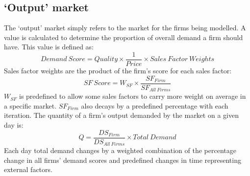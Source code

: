 \documentclass[11pt]{article}
\begin{document}
\subsection{`Output' market}
The `output' market simply refers to the market for the firms being modelled. A value is calculated to determine the proportion of overall demand a firm should have. This value is defined as:
\[
	Demand\ Score = Quality \times \frac{1}{Price} \times Sales\ Factor\ Weights
\]
Sales factor weights are the product of the firm's score for each sales factor:
\[
	SF\ Score = W_{SF} \times \frac{SF_{Firm}}{SF_{All\ Firms}}
\]
$ W_{SF} $ is predefined to allow some sales factors to carry more weight on average in a specific market. $ SF_{Firm} $ also decays by a predefined percentage with each iteration. The quantity of a firm's output demanded by the market on a given day is:
\[
	Q = \frac{DS_{Firm}}{DS_{All\ Firms}} \times Total\ Demand
\]
Each day total demand changes by a weighted combination of the percentage change in all firms' demand scores and predefined changes in time representing external factors.
\end{document}
